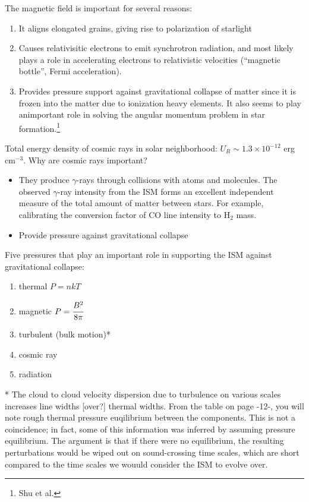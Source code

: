 \documentclass[11pt]{article}
\newcommand{\mar}[1]{\hspace{0pt}\marginpar{-\textcolor{black}{#1}-}}
\begin{document}
The magnetic field is important for several reasons:
\begin{enumerate}
    \item It aligns elongated grains, giving rise to polarization
        of starlight
    \item Causes relativisitic electrons to emit synchrotron radiation,
        and most likely plays a role in accelerating electrons to
        relativistic velocities (``magnetic bottle'', Fermi acceleration).
    \item Provides pressure support against gravitational collapse of matter
        since it is frozen into the matter due to ionization heavy elements.
        It also seems to play animportant role in solving the angular momentum
        problem in star formation.\footnote{Shu et al.}
\end{enumerate}

Total energy density of cosmic rays in solar neighborhood:
$U_{R} \sim 1.3\times10^{-12}$ erg cm$^{-3}$.
\mar{14}Why are cosmic rays important?
\begin{itemize}
    \item They produce $\gamma$-rays through collisions with atoms and
        molecules. The observed $\gamma$-ray intensity from the ISM forms
        an excellent independent measure of the total amount of matter
        between stars. For example, calibrating the conversion factor of
        CO line intensity to H$_{2}$ mass.
    \item Provide pressure against gravitational collapse
\end{itemize}
Five pressures that play an important role in supporting the ISM against
gravitational collapse:
\begin{enumerate}
    \item thermal $P=nkT$
    \item magnetic $P=\cfrac{B^{2}}{8\pi}$
    \item turbulent (bulk motion)*
    \item cosmic ray
    \item radiation
\end{enumerate}
* The cloud to cloud velocity dispersion due to turbulence on various
scales increases line widths [over?] thermal widths. From the table
on page -12-, you will note rough thermal pressure euqilibrium between
the components. This is not a coincidence; in fact, some of this
information was inferred by assuming pressure equilibrium. The
argument is that if there were no equilibrium, the resulting
perturbations would be wiped out on sound-crossing time scales, which
are short compared to\mar{15} the time scales we wouuld
consider the ISM to evolve over.
\end{document}

